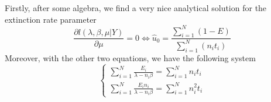 \documentclass[11pt]{beamer}
\begin{document}
\begin{frame}

Firstly, after some algebra, we find a very nice analytical solution for the extinction rate parameter
\begin{equation}
\label{mu}
 \frac{\partial l(\lambda,\beta,\mu | Y)}{\partial \mu} = 0  \Leftrightarrow \hat{u}_0 = \frac{\displaystyle\sum_{i=1}^N (1-E)}{\displaystyle\sum_{i=1}^N(n_it_i)} 
\end{equation}
\pause
Moreover, with the other two equations, we have the following system
$$\begin{cases} \displaystyle\sum_{i=1}^N \frac{E_i}{\lambda-n_i\beta} = \displaystyle\sum_{i=1}^N n_i t_i \\ \displaystyle\sum_{i=1}^N \frac{E_in_i}{\lambda-n_i\beta} = \displaystyle\sum_{i=1}^N n^2_i t_i \end{cases}$$

\end{frame}
\end{document}
